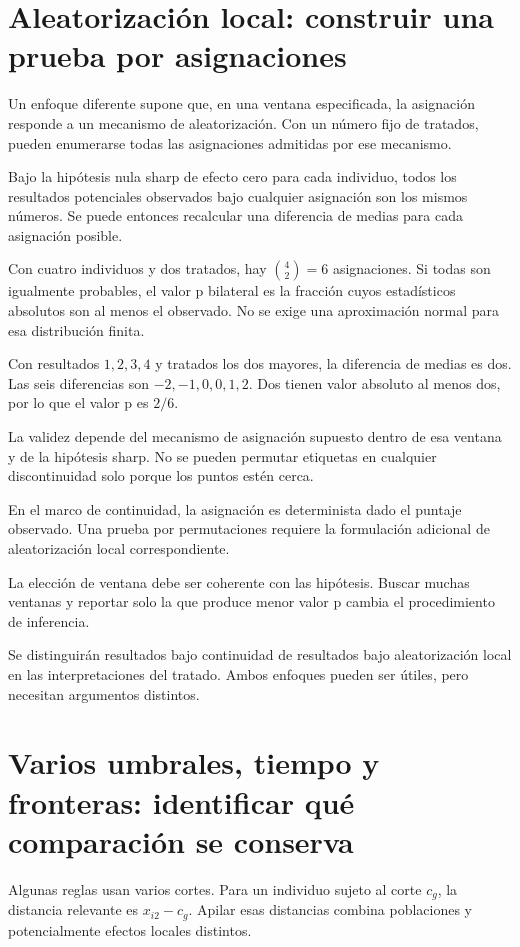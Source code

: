 \documentclass[11pt,a4paper]{article}
\begin{document}
\clearpage
\section{Aleatorización local: construir una prueba por asignaciones}\label{unidad48}
Un enfoque diferente supone que, en una ventana
especificada, la asignación responde
a un mecanismo de aleatorización.
Con un número fijo de tratados,
pueden enumerarse todas las asignaciones
admitidas por ese mecanismo.

Bajo la hipótesis nula sharp de
efecto cero para cada individuo,
todos los resultados potenciales
observados bajo cualquier asignación
son los mismos números.
Se puede entonces recalcular
una diferencia de medias
para cada asignación posible.

Con cuatro individuos y dos tratados,
hay \(\binom42=6\) asignaciones.
Si todas son igualmente probables,
el valor p bilateral es la fracción
cuyos estadísticos absolutos son
al menos el observado.
No se exige una aproximación normal
para esa distribución finita.

\begin{ejemplo}
Con resultados \(1,2,3,4\)
y tratados los dos mayores,
la diferencia de medias es dos.
Las seis diferencias son
\(-2,-1,0,0,1,2\).
Dos tienen valor absoluto al menos dos,
por lo que el valor p es \(2/6\).
\end{ejemplo}
La validez depende del mecanismo
de asignación supuesto dentro de
esa ventana y de la hipótesis sharp.
No se pueden permutar etiquetas
en cualquier discontinuidad solo
porque los puntos estén cerca.

En el marco de continuidad,
la asignación es determinista
dado el puntaje observado.
Una prueba por permutaciones
requiere la formulación adicional
de aleatorización local correspondiente.

La elección de ventana debe
ser coherente con las hipótesis.
Buscar muchas ventanas y reportar
solo la que produce menor valor p
cambia el procedimiento de inferencia.

Se distinguirán resultados bajo
continuidad de resultados bajo
aleatorización local en las
interpretaciones del tratado.
Ambos enfoques pueden ser útiles,
pero necesitan argumentos distintos.

\clearpage
\section{Varios umbrales, tiempo y fronteras: identificar qué comparación se conserva}\label{unidad49}
Algunas reglas usan varios cortes.
Para un individuo sujeto al corte \(c_g\),
la distancia relevante es \(x_{i2}-c_g\).
Apilar esas distancias combina
poblaciones y potencialmente
efectos locales distintos.
\end{document}
